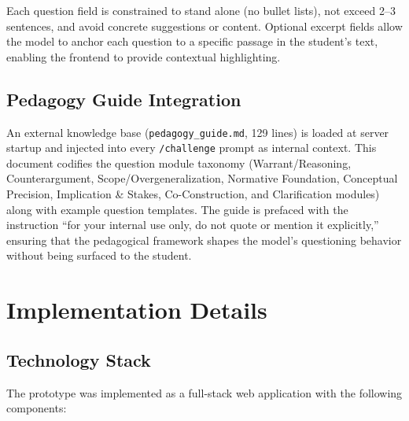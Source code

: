 \documentclass[11pt,a4paper]{article}
\begin{document}
Each question field is constrained to stand alone (no bullet lists), not exceed 2--3 sentences, and avoid concrete suggestions or content. Optional excerpt fields allow the model to anchor each question to a specific passage in the student's text, enabling the frontend to provide contextual highlighting.

\subsection{Pedagogy Guide Integration}

An external knowledge base (\texttt{pedagogy\_guide.md}, 129 lines) is loaded at server startup and injected into every \texttt{/challenge} prompt as internal context. This document codifies the question module taxonomy (Warrant/Reasoning, Counterargument, Scope/Overgeneralization, Normative Foundation, Conceptual Precision, Implication \& Stakes, Co-Construction, and Clarification modules) along with example question templates. The guide is prefaced with the instruction ``for your internal use only, do not quote or mention it explicitly,'' ensuring that the pedagogical framework shapes the model's questioning behavior without being surfaced to the student.

\section{Implementation Details}
\label{sec:implementation}

\subsection{Technology Stack}

The prototype was implemented as a full-stack web application with the following components:
\end{document}
